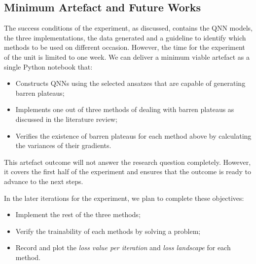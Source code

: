 \subsection{Minimum Artefact and Future Works}
\label{Minimum Artefacts}

The success conditions of the experiment, as discussed, contains the QNN models, the three implementations, the data generated and a guideline to identify which methods to be used on different occasion.
However, the time for the experiment of the unit is limited to one week. We can deliver a minimum viable artefact as a single Python notebook that:
\begin{itemize}
    \item Constructs QNNs using the selected ansatzes that are capable of generating barren plateaus;
    \item {}Implements one out of three methods of dealing with barren plateaus as discussed in the literature review;
    \item Verifies the existence of barren plateaus for each method above by calculating the variances of their gradients.
\end{itemize}

This artefact outcome will not answer the research question completely.
However, it covers the first half of the experiment and ensures that the outcome is ready to advance to the next steps.

In the later iterations for the experiment, we plan to complete these objectives:
\begin{itemize}
    \item Implement the rest of the three methods;
    \item Verify the trainability of each methods by solving a problem;
    \item Record and plot the \textit{loss value per iteration} and \textit{loss landscape} for each method.
\end{itemize}

